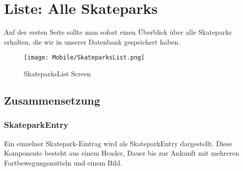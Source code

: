 \section{Liste: Alle Skateparks}
Auf der ersten Seite sollte man sofort einen Überblick über alle Skateparks erhalten, die wir in
unserer Datenbank gespeichert haben.

\begin{figure}[H]
  \begin{center}
    \texttt{[image: Mobile/SkateparksList.png]}
    \caption{SkateparksList Screen}
  \end{center}
\end{figure}

\subsection{Zusammensetzung}
\subsubsection{SkateparkEntry}
Ein einzelner Skatepark-Eintrag wird als SkateparkEntry dargestellt. Diese Komponente besteht aus
einem Header, Dauer bis zur Ankunft mit mehreren Fortbewegungsmitteln und einem Bild.

\begin{lstlisting}
  
\end{lstlisting}

